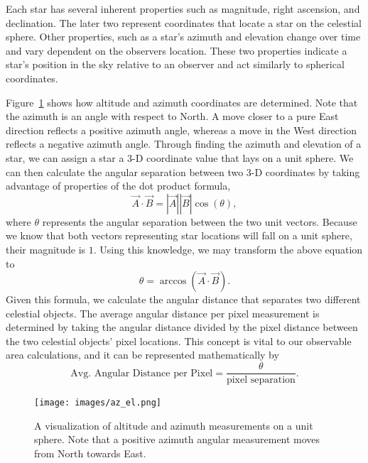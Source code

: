 Each star has several inherent properties such as magnitude, right ascension, and declination.  
The later two represent coordinates that locate a star on the celestial sphere.  
Other properties, such as a star's azimuth and elevation change over time and vary dependent on the observers location.  
These two properties indicate a star's position in the sky relative to an observer and act similarly to spherical coordinates.

Figure~\ref{altaz} shows how altitude and azimuth coordinates are determined. 
Note that the azimuth is an angle with respect to North.
A move closer to a pure East direction reflects a positive azimuth angle, whereas a move in the West direction reflects a negative azimuth angle.
Through finding the azimuth and elevation of a star, we can assign a star a 3-D coordinate value that lays on a unit sphere.  
We can then calculate the angular separation between two 3-D coordinates by taking advantage of properties of the dot product formula,
\begin{equation}
\vec{A} \cdot \vec{B} = |\vec{A}||\vec{B}| \cos{(\theta)},
\end{equation}
where $\theta$ represents the angular separation between the two unit vectors.  
Because we know that both vectors representing star locations will fall on a unit sphere, their magnitude is $1$.
Using this knowledge, we may transform the above equation to
\begin{equation}
\theta = \arccos{(\vec{A} \cdot \vec{B})}.
\end{equation}
Given this formula, we calculate the angular distance that separates two different celestial objects.
The average angular distance per pixel measurement is determined by taking the angular distance divided by the pixel distance between the two celestial objects' pixel locations.
This concept is vital to our observable area calculations, and it can be represented mathematically by
\begin{equation}
\textrm{Avg. Angular Distance per Pixel} = \frac{\theta}{\textrm{pixel separation}}.
\label{eq:important}
\end{equation}

\begin{figure}[h]
  \centering
  \texttt{[image: images/az\_el.png]}
  \caption{A visualization of altitude and azimuth measurements on a unit sphere.  Note that a positive azimuth angular measurement moves from North towards East.}
  \label{altaz}
\end{figure}



